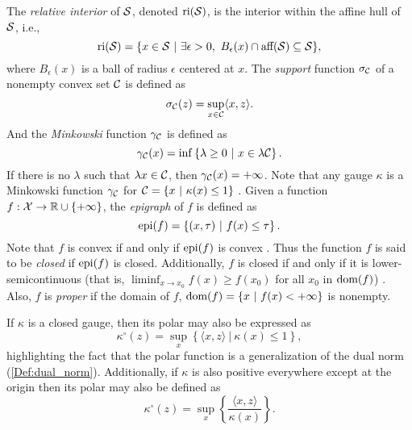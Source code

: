 \begin{enumerate}
The \textit{relative interior} of ${\mathcal S}$, denoted $\textnormal{ri}({\mathcal S})$, is the interior within the affine hull of ${\mathcal S}$, i.e.,
\begin{equation}			\label{Def:relative_interior}
\text{ri}(\caS) = \{ x \in \caS \ | \ \exists \epsilon > 0, \ B_\epsilon(x) \cap \text{aff}(\caS) \subseteq \caS  \},
\end{equation}
where $B_\epsilon(x)$ is a ball of radius $\epsilon$ centered at $x$.
The \textit{support} function $\sigma_{\mathcal C}$ of a nonempty convex set ${\mathcal C}$ is defined as
\begin{equation}		\label{Def:support_function}
\sigma_{\mathcal C}(z) = \sup_{x \in {\mathcal C}} \langle x, z \rangle.
\end{equation}
And the \textit{Minkowski} function $\gamma_{\mathcal C}$ is defined as
\begin{equation}			\label{Def:Minkowski_function}
\gamma_{\mathcal C}(x) = \inf \left\{ \lambda \geq 0 \ | \ x \in \lambda {\mathcal C}  \right\}.
\end{equation}
If there is no $\lambda$ such that $\lambda x \in {\mathcal C}$, then $\gamma_{\mathcal C}(x) = + \infty$.  Note that any gauge $\kappa$ is a Minkowski function $\gamma_{\mathcal C}$ for ${\mathcal C} = \{ x \ | \ \kappa(x) \leq 1 \}$ \cite[Section 15]{rockafellar1970convex}.  Given a function $f : {\mathcal X} \rightarrow {\mathbb R} \cup \{+\infty\}$, the \textit{epigraph} of $f$ is defined as
\begin{equation}		\label{Eqn:epigraph}
\textnormal{epi}(f) = \left\{ (x, \tau) \ | \ f(x) \leq \tau  \right\}.
\end{equation}
Note that $f$ is convex if and only if $\textnormal{epi}(f)$ is convex \cite[Section 7]{rockafellar1970convex}.  Thus the function $f$ is said to be \textit{closed} if $\textnormal{epi}(f)$ is closed.  Additionally, $f$ is closed if and only if it is lower-semicontinuous (that is, $\liminf_{x \rightarrow x_0} f(x) \geq f(x_0)$ for all $x_0$ in $\textnormal{dom}(f)$) \cite[Section 7]{rockafellar1970convex}.  Also, $f$ is \textit{proper} if the domain of $f$, $\textnormal{dom}(f) = \{ x \ | \ f(x) < +\infty \}$ is nonempty.  

If $\kappa$ is a closed gauge, then its polar may also be expressed as \cite[Section 15]{rockafellar1970convex}
\begin{equation}			\label{Def:polar_function_3}
\kappa^\circ(z) = \sup\limits_x \left\{ \langle x, z \rangle \ | \ \kappa(x) \leq 1 \right\},
\end{equation}
highlighting the fact that the polar function is a generalization of the dual norm (\ref{Def:dual_norm}).  Additionally, if $\kappa$ is also positive everywhere except at the origin then its polar may also be defined as \cite[Section 15]{rockafellar1970convex}
\begin{equation}			\label{Def:polar_function_4}
\kappa^\circ(z) = \sup\limits_x \left\{ \frac{\langle x, z \rangle}{\kappa(x)} \right\}.
\end{equation}




\end{enumerate}
